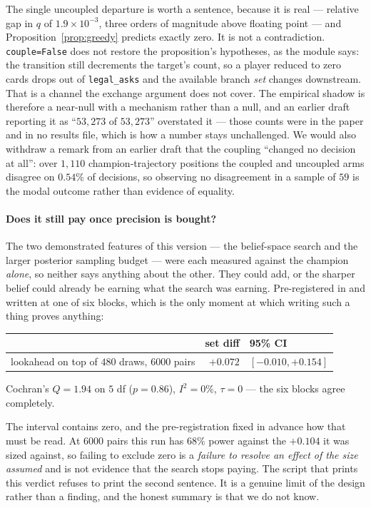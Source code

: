 \documentclass[11pt,a4paper]{article}
\begin{document}
The single uncoupled departure is worth a sentence, because it is real ---
relative gap in $q$ of $1.9\times 10^{-3}$, three orders of magnitude above
floating point --- and Proposition~\ref{prop:greedy} predicts exactly zero. It
is not a contradiction. \texttt{couple=False} does not restore the
proposition's hypotheses, as the module says: the transition still decrements
the target's count, so a player reduced to zero cards drops out of
\texttt{legal\_asks} and the available branch \emph{set} changes downstream.
That is a channel the exchange argument does not cover. The empirical shadow is
therefore a near-null with a mechanism rather than a null, and an earlier draft
reporting it as ``$53{,}273$ of $53{,}273$'' overstated it --- those counts were
in the paper and in no results file, which is how a number stays unchallenged. We would also withdraw a remark from an earlier draft that the
coupling ``changed no decision at all'': over $1{,}110$ champion-trajectory
positions the coupled and uncoupled arms disagree on $0.54\%$ of decisions, so
observing no disagreement in a sample of $59$ is the modal outcome rather than
evidence of equality.

\paragraph{Does it still pay once precision is bought?} The two demonstrated
features of this version --- the belief-space search and the larger posterior
sampling budget --- were each measured against the champion \emph{alone}, so
neither says anything about the other. They could add, or the sharper belief
could already be earning what the search was earning. Pre-registered in
 and written at one of six blocks, which
is the only moment at which writing such a thing proves anything:
\begin{center}
\begin{tabular}{lrl}
\toprule
& set diff & 95\% CI \\
\midrule
lookahead on top of $480$ draws, $6000$ pairs & $+0.072$ & $[-0.010, +0.154]$ \\
\bottomrule
\end{tabular}
\end{center}
Cochran's $Q = 1.94$ on $5$ df ($p = 0.86$), $I^2 = 0\%$, $\tau = 0$ --- the six
blocks agree completely.

The interval contains zero, and the pre-registration fixed in advance how that
must be read. At $6000$ pairs this run has $68\%$ power against the $+0.104$ it
was sized against, so failing to exclude zero is a \emph{failure to resolve an
effect of the size assumed} and is not evidence that the search stops paying.
The script that prints this verdict refuses to print the second sentence. It is
a genuine limit of the design rather than a finding, and the honest summary is
that we do not know.
\end{document}

